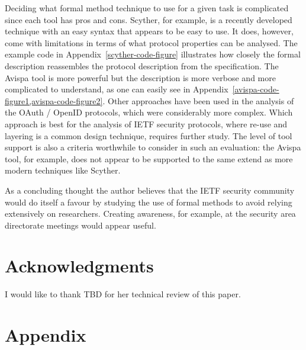 \documentclass[peerreview, a4paper, 7pt]{IEEEtran}
\begin{document}
Deciding what formal method technique to use for a given task is complicated since each tool has pros and cons. Scyther, for example, is a recently developed technique with an easy syntax that appears to be easy to use. It does, however, come with limitations in terms of what protocol properties can be analysed. The example code in Appendix~\ref{scyther-code-figure} illustrates how closely the formal description reassembles the protocol description from the specification. The Avispa tool is more powerful but the description is more verbose and more complicated to understand, as one can easily see in Appendix~\ref{avispa-code-figure1,avispa-code-figure2}. Other approaches have been used in the analysis of the OAuth / OpenID protocols, which were considerably more complex. Which approach is best for the analysis of IETF security protocols, where re-use and layering is a common design technique, requires further study. The level of tool support is also a criteria worthwhile to consider in such an evaluation: the Avispa tool, for example, does not appear to be supported to the same extend as more modern techniques like Scyther.

As a concluding thought the author believes that the IETF security community would do itself a favour by studying the use of formal methods to avoid relying extensively on researchers. Creating awareness, for example, at the security area directorate meetings would appear useful. 

\section{Acknowledgments}
I would like to thank TBD for her technical review of this paper. 
 

% 


\appendix
\section{Appendix}
\end{document}
